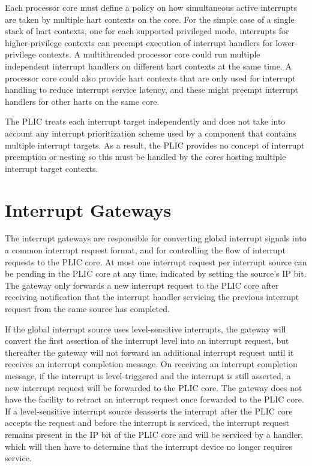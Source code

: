 Each processor core must define a policy on how simultaneous active
interrupts are taken by multiple hart contexts on the core. For the
simple case of a single stack of hart contexts, one for each supported
privileged mode, interrupts for higher-privilege contexts can preempt
execution of interrupt handlers for lower-privilege contexts.  A
multithreaded processor core could run multiple independent interrupt
handlers on different hart contexts at the same time.  A processor
core could also provide hart contexts that are only used for interrupt
handling to reduce interrupt service latency, and these might preempt
interrupt handlers for other harts on the same core.

The PLIC treats each interrupt target independently and does not take
into account any interrupt prioritization scheme used by a component
that contains multiple interrupt targets.  As a result, the PLIC
provides no concept of interrupt preemption or nesting so this must be
handled by the cores hosting multiple interrupt target contexts.

\section{Interrupt Gateways}

The interrupt gateways are responsible for converting global interrupt
signals into a common interrupt request format, and for controlling
the flow of interrupt requests to the PLIC core.  At most one
interrupt request per interrupt source can be pending in the PLIC core
at any time, indicated by setting the source's IP bit.  The gateway
only forwards a new interrupt request to the PLIC core after receiving
notification that the interrupt handler servicing the previous
interrupt request from the same source has completed.

If the global interrupt source uses level-sensitive interrupts, the
gateway will convert the first assertion of the interrupt level into
an interrupt request, but thereafter the gateway will not forward an
additional interrupt request until it receives an interrupt completion
message.  On receiving an interrupt completion message, if the
interrupt is level-triggered and the interrupt is still asserted, a
new interrupt request will be forwarded to the PLIC core.  The gateway
does not have the facility to retract an interrupt request once
forwarded to the PLIC core.  If a level-sensitive interrupt source
deasserts the interrupt after the PLIC core accepts the request and
before the interrupt is serviced, the interrupt request remains
present in the IP bit of the PLIC core and will be serviced by a
handler, which will then have to determine that the interrupt device
no longer requires service.

